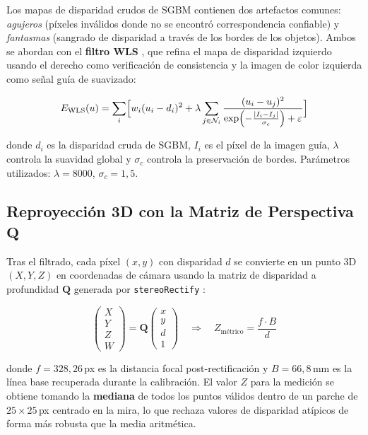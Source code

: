 \documentclass[12pt, a4paper]{article}
\begin{document}
Los mapas de disparidad crudos de SGBM contienen dos artefactos comunes:
\textit{agujeros} (píxeles inválidos donde no se encontró correspondencia confiable) y
\textit{fantasmas} (sangrado de disparidad a través de los bordes de los objetos).
Ambos se abordan con el \textbf{filtro WLS} \cite{min2014fast}, que refina el mapa
de disparidad izquierdo usando el derecho como verificación de consistencia y la
imagen de color izquierda como señal guía de suavizado:

\begin{equation}
E_{\text{WLS}}(u) = \sum_i \Bigl[
  w_i (u_i - d_i)^2
  + \lambda \sum_{j \in \mathcal{N}_i} \frac{(u_i - u_j)^2}
    {\exp\!\left(-\frac{|I_i - I_j|}{\sigma_c}\right) + \varepsilon}
\Bigr]
\end{equation}

donde $d_i$ es la disparidad cruda de SGBM, $I_i$ es el píxel de la imagen guía,
$\lambda$ controla la suavidad global y $\sigma_c$ controla la preservación de bordes.
Parámetros utilizados: $\lambda = 8000$, $\sigma_c = 1{,}5$.

\subsection{Reproyección 3D con la Matriz de Perspectiva $\mathbf{Q}$}

Tras el filtrado, cada píxel $(x, y)$ con disparidad $d$ se convierte en un punto
3D $(X, Y, Z)$ en coordenadas de cámara usando la matriz de disparidad a profundidad
$\mathbf{Q}$ generada por \texttt{stereoRectify} \cite{bradski2008learning}:

\begin{equation}
\label{eq:Q}
  \begin{pmatrix} X \\ Y \\ Z \\ W \end{pmatrix}
  = \mathbf{Q} \begin{pmatrix} x \\ y \\ d \\ 1 \end{pmatrix}
  \quad \Longrightarrow \quad
  Z_{\text{métrico}} = \frac{f \cdot B}{d}
\end{equation}

donde $f = 328{,}26$\,px es la distancia focal post-rectificación y $B = 66{,}8$\,mm
es la línea base recuperada durante la calibración. El valor $Z$ para la medición se
obtiene tomando la \textbf{mediana} de todos los puntos válidos dentro de un parche de
$25 \times 25$\,px centrado en la mira, lo que rechaza valores de disparidad atípicos
de forma más robusta que la media aritmética.
\end{document}
